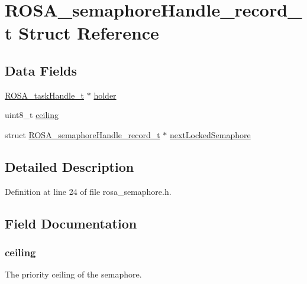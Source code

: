 \hypertarget{struct_r_o_s_a__semaphore_handle__record__t}{}\section{R\+O\+S\+A\+\_\+semaphore\+Handle\+\_\+record\+\_\+t Struct Reference}
\label{struct_r_o_s_a__semaphore_handle__record__t}
\subsection*{Data Fields}
\begin{DoxyCompactItemize}
\item 
\hyperlink{rosa__def_8h_a99fb8cee8eedbe888bf5763d30c1d5c8}{R\+O\+S\+A\+\_\+task\+Handle\+\_\+t} $\ast$ \hyperlink{struct_r_o_s_a__semaphore_handle__record__t_a461b405005227346258d6b3d1f4310f1}{holder}
\item 
uint8\+\_\+t \hyperlink{struct_r_o_s_a__semaphore_handle__record__t_ae8baa20a0ebdf83148f734cb98cf9fd2}{ceiling}
\item 
struct \hyperlink{struct_r_o_s_a__semaphore_handle__record__t}{R\+O\+S\+A\+\_\+semaphore\+Handle\+\_\+record\+\_\+t} $\ast$ \hyperlink{struct_r_o_s_a__semaphore_handle__record__t_a01c07bcd84183693c57dc655f1cf8cb5}{next\+Locked\+Semaphore}
\end{DoxyCompactItemize}


\subsection{Detailed Description}


Definition at line 24 of file rosa\+\_\+semaphore.\+h.



\subsection{Field Documentation}
\hypertarget{struct_r_o_s_a__semaphore_handle__record__t_ae8baa20a0ebdf83148f734cb98cf9fd2}{}
\subsubsection[{ceiling}]{\setlength{\rightskip}{0pt plus 5cm}ceiling}\label{struct_r_o_s_a__semaphore_handle__record__t_ae8baa20a0ebdf83148f734cb98cf9fd2}
The priority ceiling of the semaphore. 

